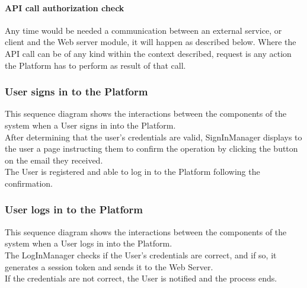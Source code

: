 \paragraph*{API call authorization check} \label{reff:authcheck}
Any time would be needed a communication between an external service, or client and the Web server module, it will happen as described below.
Where the API call can be of any kind within the context described, request is any action the Platform has to perform as result of that call.


\clearpage
\subsubsection{User signs in to the Platform}
This sequence diagram shows the interactions between the components of the system when a User signs in into the Platform.\\
After determining that the user's credentials are valid, SignInManager displays to the user a page instructing them to confirm the operation by clicking the button on the email they received.\\
The User is registered and able to log in to the Platform following the confirmation.

\clearpage
\subsubsection{User logs in to the Platform}
This sequence diagram shows the interactions between the components of the system when a User logs in into the Platform.\\
The LogInManager checks if the User's credentials are correct, and if so, it generates a session token and sends it to the Web Server.\\
If the credentials are not correct, the User is notified and the process ends.\\

\clearpage
